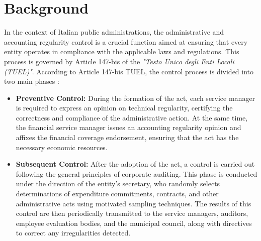 \documentclass[../main.tex]{subfiles}
\begin{document}

\section{Background}
In the context of Italian public administrations, the administrative and accounting regularity control is a crucial function aimed at ensuring that every entity operates in compliance with the applicable laws and regulations. This process is governed by Article 147-bis of the \textit{"Testo Unico degli Enti Locali (TUEL)"}. According to Article 147-bis TUEL, the control process is divided into two main phases \cite{tuel_art147bis}:

\begin{itemize}
    \item \textbf{Preventive Control:} During the formation of the act, each service manager is required to express an opinion on technical regularity, certifying the correctness and compliance of the administrative action. At the same time, the financial service manager issues an accounting regularity opinion and affixes the financial coverage endorsement, ensuring that the act has the necessary economic resources.
    \item \textbf{Subsequent Control:} After the adoption of the act, a control is carried out following the general principles of corporate auditing. This phase is conducted under the direction of the entity's secretary, who randomly selects determinations of expenditure commitments, contracts, and other administrative acts using motivated sampling techniques. The results of this control are then periodically transmitted to the service managers, auditors, employee evaluation bodies, and the municipal council, along with directives to correct any irregularities detected.
\end{itemize}
\end{document}
